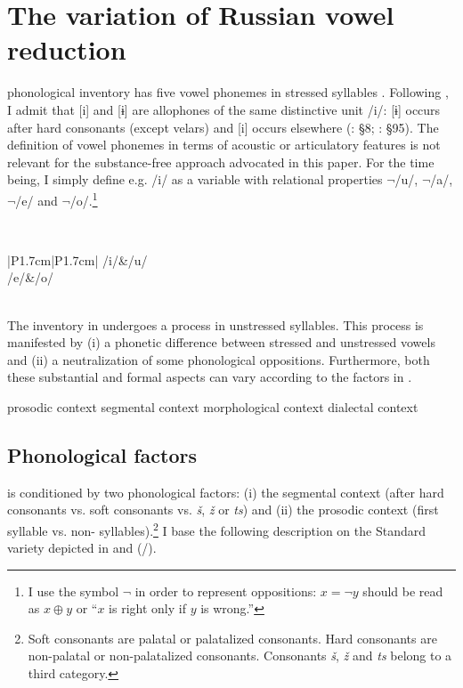 \documentclass[output=paper,modfonts,newtxmath,hidelinks,]{langscibook}
\begin{document}
\section{The variation of Russian vowel reduction}\label{5:s2}

 phonological inventory has five vowel phonemes in stressed syllables . Following \citet[§19]{Garde1998}, I admit that [i] and [ɨ] are allophones of the same distinctive unit /i/: [ɨ] occurs after hard consonants (except velars) and [i] occurs elsewhere (\citealt{Avanesov1968}: §8; \citealt{Garde1998}: §95). The definition of vowel phonemes in terms of acoustic or articulatory features is not relevant for the substance-free approach advocated in this paper. For the time being, I simply define e.g. /i/ as a variable with relational properties $\neg$/u/, $\neg$/a/, $\neg$/e/ and $\neg$/o/.\footnote{\label{5:fn1}I use the  symbol $\neg$ in order to represent oppositions: $x=\neg y$ should be read as $x\oplus y$ or “$x$ is right only if $y$ is wrong.”}

\label{5:1}\\\medskip
\begin{tabular}{|P{1.7cm}|P{1.7cm}|}
\hline
/i/&/u/\\\hline
/e/&/o/\\\hline
{}\\\hline
\end{tabular}
\z

\noindent The inventory in  undergoes a  process in unstressed syllables. This process is manifested by (i) a phonetic difference between stressed and unstressed vowels and (ii) a neutralization of some phonological oppositions. Furthermore, both these substantial and formal aspects can vary according to the factors in .

\ea\label{5:2}\ea prosodic context
\ex segmental context
\ex morphological context
\ex dialectal context
\z\z

\subsection{Phonological factors}\label{5:s2.1}

  is conditioned by two phonological factors: (i) the segmental context (after hard consonants vs. soft consonants vs. \textit{š}, \textit{ž} or \textit{ts}) and (ii) the prosodic context (first  syllable vs. non- syllables).\footnote{Soft consonants are palatal or palatalized consonants. Hard consonants are non-palatal or non-palatalized consonants. Consonants \textit{š}, \textit{ž} and \textit{ts} belong to a third category.} I base the following description on the Standard  variety depicted in \citet{Avanesov1968} and \citeauthor{Garde1980} (\citeyear{Garde1980}/\citeyear{Garde1998}).
\end{document}
